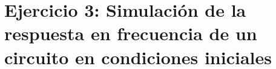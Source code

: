 \section*{\color{olive}Ejercicio 3: Simulaci\'on de la respuesta en frecuencia de un circuito en condiciones iniciales}
